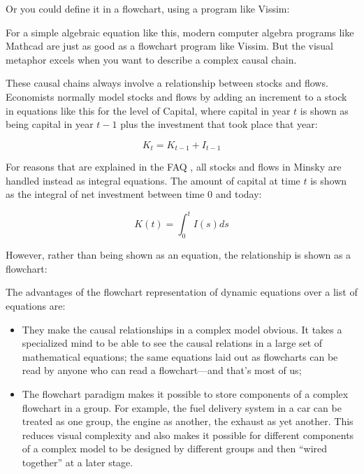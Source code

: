 Or you could define it in a flowchart, using a program like Vissim:

\begin{center}
\end{center}

For a simple algebraic equation like this, modern computer algebra
programs like Mathcad are just as good as a flowchart program like
Vissim. But the visual metaphor excels when you want to describe a
complex causal chain.


These causal chains always involve a relationship between stocks and
flows. Economists normally model stocks and flows by adding an
increment to a stock in equations like this for the level of Capital,
where capital in year $t$ is shown as being capital in year $t-1$ plus
the investment that took place that year:

\begin{displaymath}
K_t=K_{t-1}+I_{t-1}
\end{displaymath}

For reasons that are explained in the FAQ , all stocks and flows in Minsky are
handled instead as integral equations. The amount of capital at time
$t$ is shown as the integral of net investment between time 0 and
today:

\begin{displaymath}
K(t)=\int_0^t I(s)ds
\end{displaymath}

However, rather than being shown as an equation, the relationship is shown as a flowchart:

\begin{center}
\end{center}

The advantages of the flowchart representation of dynamic equations
over a list of equations are:
\begin{itemize}
\item    They make the causal relationships in a complex model
  obvious. It takes a specialized mind to be able to see the causal
  relations in a large set of mathematical equations; the same
  equations laid out as flowcharts can be read by anyone who can read
  a flowchart---and that's most of us;
\item The flowchart paradigm makes it possible to store components of
  a complex flowchart in a group. For example, the fuel delivery
  system in a car can be treated as one group, the engine as another,
  the exhaust as yet another. This reduces visual complexity and also
  makes it possible for different components of a complex model to be
  designed by different groups and then ``wired together'' at a later
  stage.
\end{itemize}


